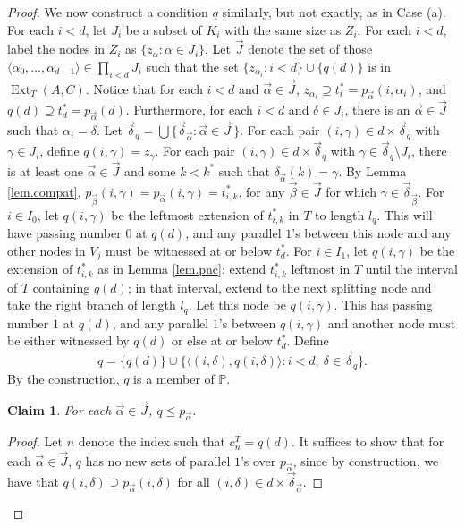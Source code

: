 \documentclass{amsart}
\newtheorem{claim}{Claim}
\theoremstyle{remark}
\theoremstyle{definition}
\theoremstyle{remark}
\newcommand{\al}{\alpha}
\newcommand{\contains}{\supseteq}
\DeclareMathOperator{\Ext}{Ext}
\newcommand{\bP}{\mathbb{P}}
\newcommand{\lgl}{\langle}
\newcommand{\rgl}{\rangle}
\begin{document}
\begin{proof}
We now construct a condition $q$ similarly, but not exactly, as in   Case (a).
For each $i<d$,
let $J_i$ be a subset of $K_i$ with the same size as $Z_i$.
For each $i< d$, label the nodes in $Z_i$ as
$\{z_{\al}:\al\in J_i\}$.
Let $\vec{J}$ denote the set of those $\lgl \al_0,\dots,\al_{d-1}\rgl\in \prod_{i< d}J_i$ such that  the set
$\{z_{\al_i}:i< d\}\cup\{q(d)\}$ is in $\Ext_T(A,C)$.
Notice that for each $i<d$ and
$\vec\al\in \vec{J}$, $z_{\al_i}\contains t^*_i=p_{\vec{\al}}(i,\al_i)$, and $q(d)\contains t^*_d=p_{\vec{\al}}(d)$.
Furthermore, for each $i<d$ and   $\delta\in J_i$,
there is an $\vec\al\in\vec{J}$ such that $\al_i=\delta$.
Let
 $\vec{\delta}_q=\bigcup\{\vec{\delta}_{\vec\al}:\vec\al\in \vec{J}\,\}$.
For each pair $(i,\gamma)\in d\times\vec{\delta}_q$ with  $\gamma\in J_i$,
define $q(i,\gamma)=z_{\gamma}$.
For  each pair $(i,\gamma)\in d\times\vec{\delta}_q$
with  $\gamma\in\vec{\delta}_q\setminus
J_i$,
there is at least one $\vec{\al}\in\vec{J}$ and some $k<k^*$ such that $\delta_{\vec\al}(k)=\gamma$.
By Lemma \ref{lem.compat},
$p_{\vec\beta}(i,\gamma)=p_{\vec{\al}}(i,\gamma)=t^*_{i,k}$,
for any  $\vec\beta\in\vec{J}$ for which $\gamma\in\vec{\delta}_{\vec\beta}$.
For $i\in I_0$,
let $q(i,\gamma)$ be the leftmost extension
 of $t_{i,k}^*$ in $T$ to length $l_q$.
This will have passing number $0$ at $q(d)$, and any parallel $1$'s between this node and any other nodes in $V_j$ must be witnessed at or below $t^*_d$.
For $i\in I_1$, let $q(i,\gamma)$ be the extension of $t_{i,k}^*$
as in Lemma \ref{lem.pnc}:
extend $t_{i,k}^*$  leftmost  in $T$ until the  interval  of $T$  containing $q(d)$; in that interval,  extend to the next splitting node
 and take the right branch  of length $l_q$.
Let this node be $q(i,\gamma)$.
This has  passing number $1$ at $q(d)$, and
any parallel $1$'s between  $q(i,\gamma)$ and another node must be either witnessed by $q(d)$ or else at or  below $t^*_d$.
Define
\begin{equation}
q=\{q(d)\}\cup \{\lgl (i,\delta),q(i,\delta)\rgl: i<d,\  \delta\in \vec{\delta}_q\}.
\end{equation}
By the construction, $q$ is a member of $\bP$.



\begin{claim}\label{claim.qbelowpal}
For each $\vec\al\in \vec{J}$,
$q\le p_{\vec\al}$.
\end{claim}



\begin{proof}
Let $n$ denote  the  index   such that $c^T_n=q(d)$.
It suffices to show that for each $\vec\al\in\vec{J}$,
$q$ has no new sets of parallel $1$'s over $p_{\vec\al}$,
 since by construction, we have that
$q(i,\delta)\contains p_{\vec{\al}}(i,\delta)$ for all $(i,\delta)\in d\times \vec{\delta}_{\vec\al}$.



\end{proof}
\end{proof}
\end{document}
